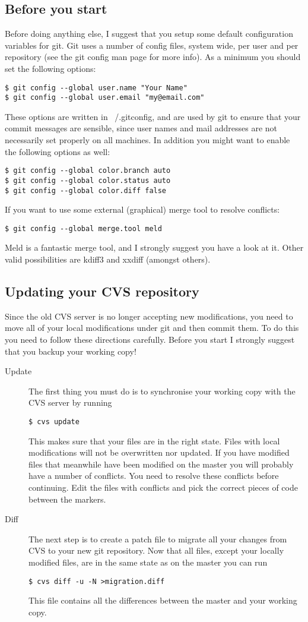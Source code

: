 \documentclass[a4paper,10pt]{article}
\begin{document}
\subsection{Before you start}
Before doing anything else, I suggest that you setup some default
configuration variables for git. Git uses a number of config files, system
wide, per user and per repository (see the git config man page for more info).
As a minimum you should set the following options:
\begin{verbatim}
$ git config --global user.name "Your Name"
$ git config --global user.email "my@email.com"
\end{verbatim}
These options are written in ~/.gitconfig, and are used by git to ensure that
your commit messages are sensible, since user names and mail addresses are not
necessarily set properly on all machines. In addition you might want to enable
the following options as well:
\begin{verbatim}
$ git config --global color.branch auto
$ git config --global color.status auto
$ git config --global color.diff false
\end{verbatim}
If you want to use some external (graphical) merge tool to resolve conflicts:
\begin{verbatim}
$ git config --global merge.tool meld
\end{verbatim}
Meld is a fantastic merge tool, and I strongly suggest you have a look at it.
Other valid possibilities are kdiff3 and xxdiff (amongst others).

\subsection{Updating your CVS repository}
Since the old CVS server is no longer accepting new modifications, you need to
move all of your local modifications under git and then commit them. To do
this you need to follow these directions carefully. Before you start I
strongly suggest that you backup your working copy!
\begin{description}
\item[Update] The first thing you must do is to synchronise your working
copy with the CVS server by running
\begin{verbatim}
$ cvs update
\end{verbatim}
This makes sure that your files are in the right state. 
Files with local modifications will not be overwritten nor
updated. If you have modified files that meanwhile have been modified on the
master you will probably have a number of conflicts. You need to resolve these
conflicts before continuing. Edit the files with conflicts and pick the
correct pieces of code between the markers.
\item[Diff] The next step is to create a patch file to migrate all your
changes from CVS to your new git repository. 
Now that all files, except your locally modified files, are in the same state
as on the master you can run
\begin{verbatim}
$ cvs diff -u -N >migration.diff
\end{verbatim}
This file contains all the differences between the master and your working
copy.
\end{description}
\end{document}
